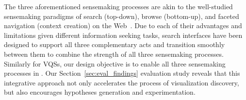    \par The three aforementioned sensemaking processes are akin to the well-studied sensemaking paradigms of search (top-down), browse (bottom-up), and faceted navigation (context creation) on the Web~\cite{Hearst2009,Olston2003}. Due to each of their advantages and limitations given different information seeking tasks, search interfaces have been designed to support all three complementary acts and transition smoothly between them to combine the strength of all three sensemaking processes. Similarly for VQSs, our design objective is to enable all three sensemaking processes in \zvpp. Our Section~\ref{sec:eval_findings} evaluation study reveals that this integrative approach not only accelerates the process of visualization discovery, but also encourages hypotheses generation and experimentation.